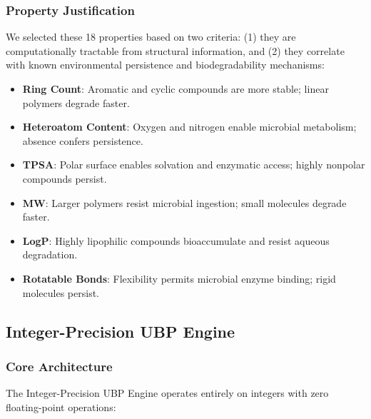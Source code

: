 \documentclass[11pt,letterpaper]{article}
\begin{document}
\subsubsection{Property Justification}

We selected these 18 properties based on two criteria: (1) they are computationally tractable from structural information, and (2) they correlate with known environmental persistence and biodegradability mechanisms:

\begin{itemize}
    \item \textbf{Ring Count}: Aromatic and cyclic compounds are more stable; linear polymers degrade faster.
    \item \textbf{Heteroatom Content}: Oxygen and nitrogen enable microbial metabolism; absence confers persistence.
    \item \textbf{TPSA}: Polar surface enables solvation and enzymatic access; highly nonpolar compounds persist.
    \item \textbf{MW}: Larger polymers resist microbial ingestion; small molecules degrade faster.
    \item \textbf{LogP}: Highly lipophilic compounds bioaccumulate and resist aqueous degradation.
    \item \textbf{Rotatable Bonds}: Flexibility permits microbial enzyme binding; rigid molecules persist.
\end{itemize}

\subsection{Integer-Precision UBP Engine}

\subsubsection{Core Architecture}

The Integer-Precision UBP Engine operates entirely on integers with zero floating-point operations:
\end{document}
